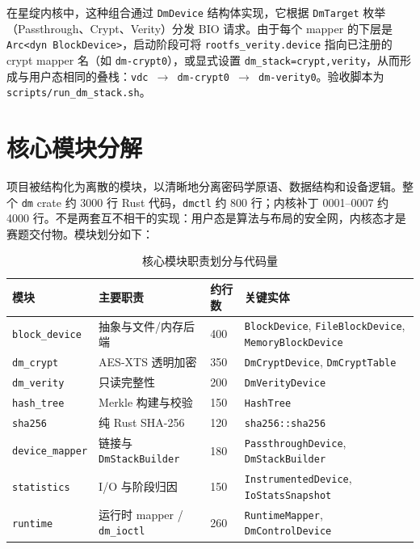 在星绽内核中，这种组合通过 \texttt{DmDevice} 结构体实现，它根据 \texttt{DmTarget} 枚举（Passthrough、Crypt、Verity）分发 BIO 请求。由于每个 mapper 的下层是 \texttt{Arc<dyn BlockDevice>}，启动阶段可将 \texttt{rootfs\_verity.device} 指向已注册的 crypt mapper 名（如 \texttt{dm-crypt0}），或显式设置 \texttt{dm\_stack=crypt,verity}，从而形成与用户态相同的叠栈：\texttt{vdc $\to$ dm-crypt0 $\to$ dm-verity0}。验收脚本为 \texttt{scripts/run\_dm\_stack.sh}。

\section{核心模块分解}

项目被结构化为离散的模块，以清晰地分离密码学原语、数据结构和设备逻辑。整个 \texttt{dm} crate 约 3000 行 Rust 代码，\texttt{dmctl} 约 800 行；内核补丁 0001--0007 约 4000 行。不是两套互不相干的实现：用户态是算法与布局的安全网，内核态才是赛题交付物。模块划分如下：

\begin{table}[H]
    \centering
    \caption{核心模块职责划分与代码量}
    \begin{tabular}{p{}p{}p{}p{}}
        \toprule
        \textbf{模块} & \textbf{主要职责} & \textbf{约行数} & \textbf{关键实体} \\
        \midrule
        \texttt{block\_device} & 抽象与文件/内存后端 & 400 & \texttt{BlockDevice}, \texttt{FileBlockDevice}, \texttt{MemoryBlockDevice} \\
        \texttt{dm\_crypt} & AES-XTS 透明加密 & 350 & \texttt{DmCryptDevice}, \texttt{DmCryptTable} \\
        \texttt{dm\_verity} & 只读完整性 & 200 & \texttt{DmVerityDevice} \\
        \texttt{hash\_tree} & Merkle 构建与校验 & 150 & \texttt{HashTree} \\
        \texttt{sha256} & 纯 Rust SHA-256 & 120 & \texttt{sha256::sha256} \\
        \texttt{device\_mapper} & 链接与 \texttt{DmStackBuilder} & 180 & \texttt{PassthroughDevice}, \texttt{DmStackBuilder} \\
        \texttt{statistics} & I/O 与阶段归因 & 150 & \texttt{InstrumentedDevice}, \texttt{IoStatsSnapshot} \\
        \texttt{runtime} & 运行时 mapper / \texttt{dm\_ioctl} & 260 & \texttt{RuntimeMapper}, \texttt{DmControlDevice} \\
        \bottomrule
    \end{tabular}
\end{table}

